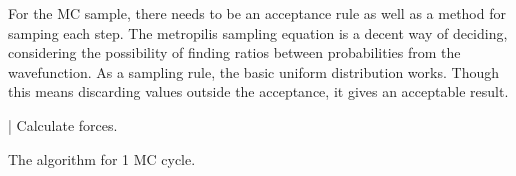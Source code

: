 \documentclass[10pt]{revtex4-1}
\begin{document}
For the MC sample, there needs to be an acceptance rule as well as a method for samping each step. The metropilis sampling equation is a decent way of deciding,
considering the possibility of finding ratios between probabilities from the wavefunction. As a sampling rule, the basic uniform distribution works.
Though this means discarding values outside the acceptance, it gives an acceptable result.


\begin{algorithm}
    | Calculate forces.
    \caption{The algorithm for 1 MC cycle. }
\end{algorithm}
\end{document}
